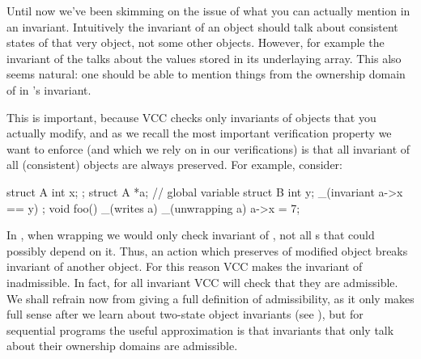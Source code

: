 Until now we've been skimming on the issue of what you can actually
mention in an invariant. 
Intuitively the invariant of an object should talk about consistent states
of that very object, not some other objects.
However, for example the invariant of the  
talks about the values stored in its underlaying array.
This also seems natural: one should be able to mention things
from the ownership domain of  in 's invariant.

This is important, because VCC checks only invariants of objects
that you actually modify, and as we recall the most important
verification property we want to enforce (and which we rely on in our
verifications) is that all invariant of all (consistent) objects 
are always preserved.
For example, consider:

\begin{VCC}
struct A { 
  int x;
};
struct A *a; // global variable
struct B {
  int y;
  _(invariant a->x == y)
};
void foo()
  _(writes a)
{
  _(unwrapping a) {
    a->x = 7;
  }
}
\end{VCC}

\noindent
In , when wrapping  we would only check invariant
of , not all s that could possibly depend on it.
Thus, an action which preserves of modified object breaks invariant of another object.
For this reason VCC makes the invariant of  inadmissible.
In fact, for all invariant VCC will check that they are admissible.
We shall refrain now from giving a full definition of admissibility, as 
it only makes full sense after we learn about two-state object invariants
(see ), but for sequential programs the useful approximation
is that invariants that only talk about their ownership domains are admissible.


